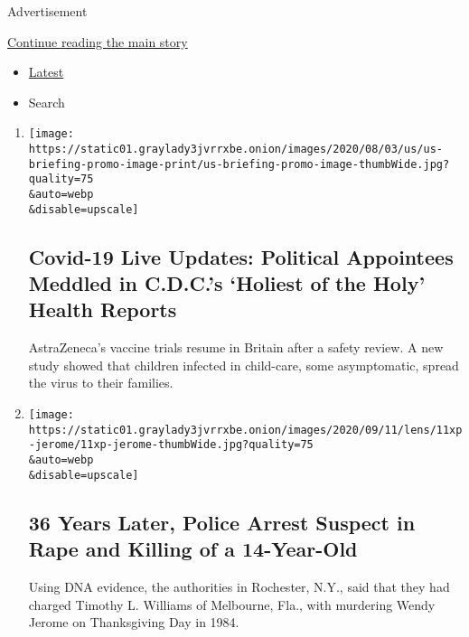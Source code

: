 Advertisement

\protect\hyperlink{after-mid1}{Continue reading the main story}

\begin{itemize}
\tightlist
\item
  \protect\hyperlink{stream-panel}{Latest}
\item
  Search
\end{itemize}

\begin{enumerate}
\def\labelenumi{\arabic{enumi}.}
\item
  \href{/2020/09/12/world/covid-19-coronavirus.html}{}

  \texttt{[image: https://static01.graylady3jvrrxbe.onion/images/2020/08/03/us/us-briefing-promo-image-print/us-briefing-promo-image-thumbWide.jpg?quality=75\\\&auto=webp\\\&disable=upscale]}

  \hypertarget{covid-19-live-updates-political-appointees-meddled-in-cdcs-holiest-of-the-holy-health-reports}{%
  \subsection{Covid-19 Live Updates: Political Appointees Meddled in
  C.D.C.'s `Holiest of the Holy' Health
  Reports}\label{covid-19-live-updates-political-appointees-meddled-in-cdcs-holiest-of-the-holy-health-reports}}

  AstraZeneca's vaccine trials resume in Britain after a safety review.
  A new study showed that children infected in child-care, some
  asymptomatic, spread the virus to their families.
\item
  \href{/2020/09/11/nyregion/Wendy-Jerome-arrest.html}{}

  \texttt{[image: https://static01.graylady3jvrrxbe.onion/images/2020/09/11/lens/11xp-jerome/11xp-jerome-thumbWide.jpg?quality=75\\\&auto=webp\\\&disable=upscale]}

  \hypertarget{36-years-later-police-arrest-suspect-in-rape-and-killing-of-a-14-year-old}{%
  \subsection{36 Years Later, Police Arrest Suspect in Rape and Killing
  of a
  14-Year-Old}\label{36-years-later-police-arrest-suspect-in-rape-and-killing-of-a-14-year-old}}

  Using DNA evidence, the authorities in Rochester, N.Y., said that they
  had charged Timothy L. Williams of Melbourne, Fla., with murdering
  Wendy Jerome on Thanksgiving Day in 1984.


\end{enumerate}
